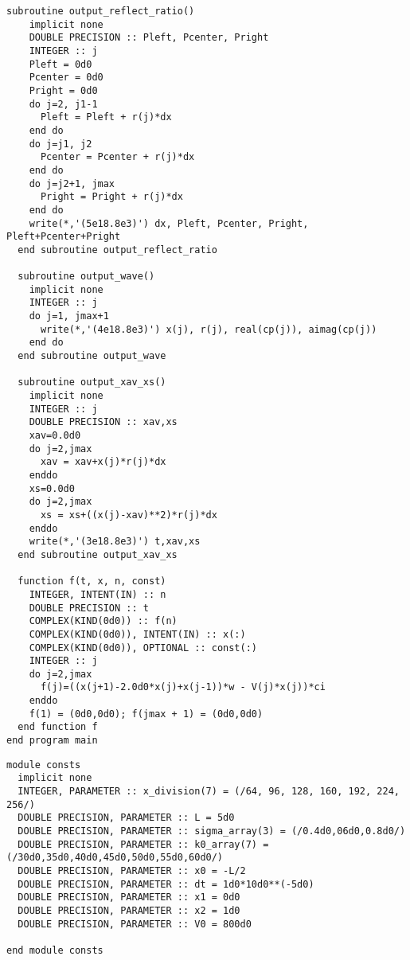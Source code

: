 \begin{lstlisting}[caption=4-B.のソースコード,label=src4b]
  subroutine output_reflect_ratio()
    implicit none
    DOUBLE PRECISION :: Pleft, Pcenter, Pright
    INTEGER :: j
    Pleft = 0d0
    Pcenter = 0d0
    Pright = 0d0
    do j=2, j1-1
      Pleft = Pleft + r(j)*dx
    end do
    do j=j1, j2
      Pcenter = Pcenter + r(j)*dx
    end do
    do j=j2+1, jmax
      Pright = Pright + r(j)*dx
    end do
    write(*,'(5e18.8e3)') dx, Pleft, Pcenter, Pright, Pleft+Pcenter+Pright
  end subroutine output_reflect_ratio
  
  subroutine output_wave()
    implicit none
    INTEGER :: j
    do j=1, jmax+1
      write(*,'(4e18.8e3)') x(j), r(j), real(cp(j)), aimag(cp(j))
    end do
  end subroutine output_wave

  subroutine output_xav_xs()
    implicit none
    INTEGER :: j
    DOUBLE PRECISION :: xav,xs
    xav=0.0d0
    do j=2,jmax
      xav = xav+x(j)*r(j)*dx
    enddo
    xs=0.0d0
    do j=2,jmax
      xs = xs+((x(j)-xav)**2)*r(j)*dx
    enddo
    write(*,'(3e18.8e3)') t,xav,xs
  end subroutine output_xav_xs
  
  function f(t, x, n, const)
    INTEGER, INTENT(IN) :: n
    DOUBLE PRECISION :: t
    COMPLEX(KIND(0d0)) :: f(n)
    COMPLEX(KIND(0d0)), INTENT(IN) :: x(:)
    COMPLEX(KIND(0d0)), OPTIONAL :: const(:)
    INTEGER :: j
    do j=2,jmax
      f(j)=((x(j+1)-2.0d0*x(j)+x(j-1))*w - V(j)*x(j))*ci
    enddo
    f(1) = (0d0,0d0); f(jmax + 1) = (0d0,0d0)
  end function f
end program main
\end{lstlisting}
\newpage
\begin{lstlisting}[caption=定数module,label=srcConsts]
module consts
  implicit none
  INTEGER, PARAMETER :: x_division(7) = (/64, 96, 128, 160, 192, 224, 256/)
  DOUBLE PRECISION, PARAMETER :: L = 5d0
  DOUBLE PRECISION, PARAMETER :: sigma_array(3) = (/0.4d0,06d0,0.8d0/)
  DOUBLE PRECISION, PARAMETER :: k0_array(7) = (/30d0,35d0,40d0,45d0,50d0,55d0,60d0/)
  DOUBLE PRECISION, PARAMETER :: x0 = -L/2
  DOUBLE PRECISION, PARAMETER :: dt = 1d0*10d0**(-5d0)
  DOUBLE PRECISION, PARAMETER :: x1 = 0d0
  DOUBLE PRECISION, PARAMETER :: x2 = 1d0
  DOUBLE PRECISION, PARAMETER :: V0 = 800d0

end module consts
\end{lstlisting}
\newpage
